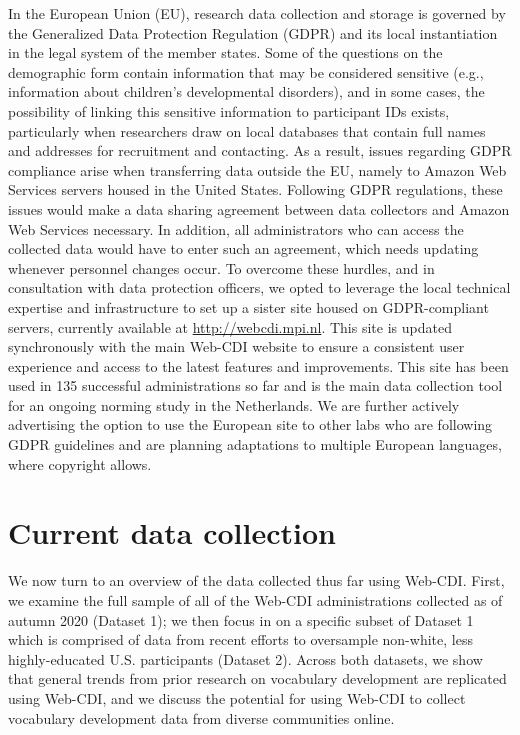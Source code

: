\documentclass[
  english,
  ,man,floatsintext]{apa6}
\begin{document}
In the European Union (EU), research data collection and storage is governed by the Generalized Data Protection Regulation (GDPR) and its local instantiation in the legal system of the member states. Some of the questions on the demographic form contain information that may be considered sensitive (e.g., information about children's developmental disorders), and in some cases, the possibility of linking this sensitive information to participant IDs exists, particularly when researchers draw on local databases that contain full names and addresses for recruitment and contacting. As a result, issues regarding GDPR compliance arise when transferring data outside the EU, namely to Amazon Web Services servers housed in the United States. Following GDPR regulations, these issues would make a data sharing agreement between data collectors and Amazon Web Services necessary. In addition, all administrators who can access the collected data would have to enter such an agreement, which needs updating whenever personnel changes occur. To overcome these hurdles, and in consultation with data protection officers, we opted to leverage the local technical expertise and infrastructure to set up a sister site housed on GDPR-compliant servers, currently available at \url{http://webcdi.mpi.nl}. This site is updated synchronously with the main Web-CDI website to ensure a consistent user experience and access to the latest features and improvements. This site has been used in 135 successful administrations so far and is the main data collection tool for an ongoing norming study in the Netherlands. We are further actively advertising the option to use the European site to other labs who are following GDPR guidelines and are planning adaptations to multiple European languages, where copyright allows.

\hypertarget{current-data-collection}{%
\section{Current data collection}\label{current-data-collection}}

We now turn to an overview of the data collected thus far using Web-CDI. First, we examine the full sample of all of the Web-CDI administrations collected as of autumn 2020 (Dataset 1); we then focus in on a specific subset of Dataset 1 which is comprised of data from recent efforts to oversample non-white, less highly-educated U.S. participants (Dataset 2). Across both datasets, we show that general trends from prior research on vocabulary development are replicated using Web-CDI, and we discuss the potential for using Web-CDI to collect vocabulary development data from diverse communities online.
\end{document}
